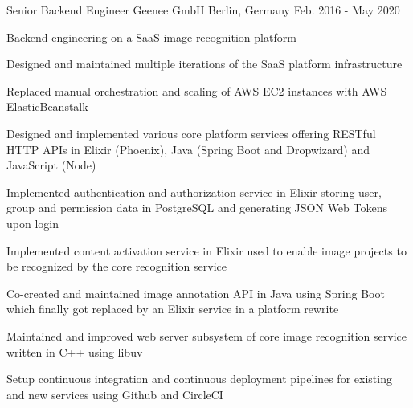 \begin{cventries}
  \cventry
    {Senior Backend Engineer} %
    {Geenee GmbH} %
    {Berlin, Germany} %
    {Feb. 2016 - May 2020} %
    {
      \begin{cvitems} %
        \item {Backend engineering on a SaaS image recognition platform}
        \begin{cvsubitems}
          \item {Designed and maintained multiple iterations of the SaaS platform infrastructure}
          \item {Replaced manual orchestration and scaling of AWS EC2 instances with AWS ElasticBeanstalk}
        \end{cvsubitems}
        \item {Designed and implemented various core platform services offering RESTful HTTP APIs in Elixir (Phoenix), Java (Spring Boot and Dropwizard) and JavaScript (Node)}
        \begin{cvsubitems}
          \item {Implemented authentication and authorization service in Elixir storing user, group and permission data in PostgreSQL and generating JSON Web Tokens upon login}
          \item {Implemented content activation service in Elixir used to enable image projects to be recognized by the core recognition service}
          \item {Co-created and maintained image annotation API in Java using Spring Boot which finally got replaced by an Elixir service in a platform rewrite}
        \end{cvsubitems}
        \item {Maintained and improved web server subsystem of core image recognition service written in C++ using libuv}
        \item {Setup continuous integration and continuous deployment pipelines for existing and new services using Github and CircleCI}
      \end{cvitems}
    }


\end{cventries}
